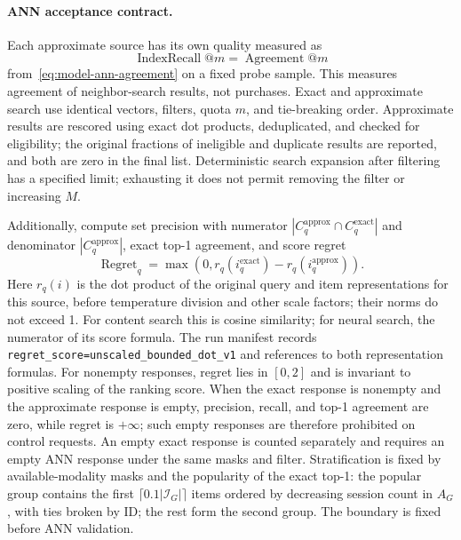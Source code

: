 \documentclass[12pt,a4paper]{article}
\newcommand{\code}[1]{{\ttfamily\small\nolinkurl{#1}}}
\theoremstyle{plainru}
\begin{document}
\paragraph{ANN acceptance contract.}\label{sec:ops-ann-contract}
Each approximate source has its own quality measured as
\begin{equation}\label{eq:ops-ann-recall}
\operatorname{IndexRecall}@m=\operatorname{Agreement}@m
\end{equation}
from~\eqref{eq:model-ann-agreement} on a fixed probe sample.
This measures agreement of neighbor-search results, not purchases.
Exact and approximate search use identical vectors, filters,
quota $m$, and tie-breaking order. Approximate results are rescored
using exact dot products, deduplicated,
and checked for eligibility; the original fractions of ineligible and duplicate
results are reported, and both are zero in the final list.
Deterministic search expansion after filtering has a specified
limit; exhausting it does not permit removing the filter or increasing $M$.

Additionally, compute set precision with numerator
$|C_q^{\mathrm{approx}}\cap C_q^{\mathrm{exact}}|$ and denominator
$|C_q^{\mathrm{approx}}|$, exact top-1 agreement, and score regret
\[
\operatorname{Regret}_q=
\max(0,r_q(i_q^{\mathrm{exact}})-r_q(i_q^{\mathrm{approx}})).
\]
Here $r_q(i)$ is the dot product of the original query
and item representations for this source, before temperature division and
other scale factors; their norms do not exceed 1. For content
search this is cosine similarity; for neural search, the numerator of its score formula.
The run manifest records \code{regret_score=unscaled_bounded_dot_v1} and references
to both representation formulas. For nonempty responses, regret lies
in $[0,2]$ and is invariant to positive scaling of the ranking score.
When the exact response is nonempty and the approximate response is empty, precision, recall,
and top-1 agreement are zero, while regret is $+\infty$;
such empty responses are therefore prohibited on control requests.
An empty exact response is counted separately and requires an empty
ANN response under the same masks and filter. Stratification is fixed
by available-modality masks and the popularity of the exact top-1:
the popular group contains the first $\lceil0.1|\mathcal I_G|\rceil$ items
ordered by decreasing session count in $A_G$, with ties broken by ID;
the rest form the second group. The boundary is fixed before ANN validation.
\end{document}
